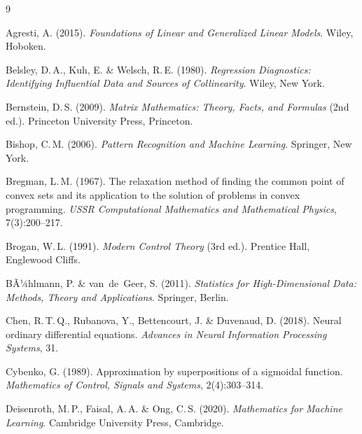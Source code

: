 ﻿\documentclass[12pt, a4paper]{article}
\theoremstyle{definition}
\theoremstyle{remark}
\begin{document}
\begin{thebibliography}{9}

Agresti, A. (2015).
\newblock \textit{Foundations of Linear and Generalized Linear Models}.
\newblock Wiley, Hoboken.

Belsley, D.\,A., Kuh, E. \& Welsch, R.\,E. (1980).
\newblock \textit{Regression Diagnostics: Identifying Influential Data and
  Sources of Collinearity}.
\newblock Wiley, New York.

Bernstein, D.\,S. (2009).
\newblock \textit{Matrix Mathematics: Theory, Facts, and Formulas} (2nd ed.).
\newblock Princeton University Press, Princeton.

Bishop, C.\,M. (2006).
\newblock \textit{Pattern Recognition and Machine Learning}.
\newblock Springer, New York.

Bregman, L.\,M. (1967).
\newblock The relaxation method of finding the common point of convex sets and
  its application to the solution of problems in convex programming.
\newblock \textit{USSR Computational Mathematics and Mathematical Physics},
  7(3):200--217.

Brogan, W.\,L. (1991).
\newblock \textit{Modern Control Theory} (3rd ed.).
\newblock Prentice Hall, Englewood Cliffs.

BÃ¼hlmann, P. \& van~de~Geer, S. (2011).
\newblock \textit{Statistics for High-Dimensional Data: Methods, Theory and
  Applications}.
\newblock Springer, Berlin.

Chen, R.\,T.\,Q., Rubanova, Y., Bettencourt, J. \& Duvenaud, D. (2018).
\newblock Neural ordinary differential equations.
\newblock \textit{Advances in Neural Information Processing Systems}, 31.

Cybenko, G. (1989).
\newblock Approximation by superpositions of a sigmoidal function.
\newblock \textit{Mathematics of Control, Signals and Systems}, 2(4):303--314.

Deisenroth, M.\,P., Faisal, A.\,A. \& Ong, C.\,S. (2020).
\newblock \textit{Mathematics for Machine Learning}.
\newblock Cambridge University Press, Cambridge.


\end{thebibliography}
\end{document}
